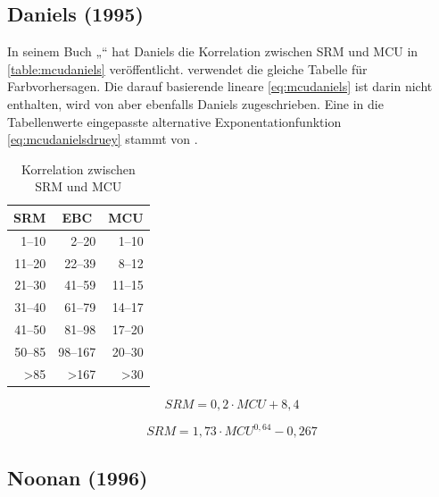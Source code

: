 \documentclass[a4paper,parskip=half]{scrartcl}
\newcommand{\MCUL}{\mathit{MCU}}
\newcommand{\SRM}{\mathit{SRM}}
\begin{document}
\subsection*{Daniels (1995)}

In seinem Buch „“ hat Daniels die Korrelation zwischen SRM und MCU in \autoref{table:mcudaniels} veröffentlicht. \textcite[10]{Holle2010} verwendet die gleiche Tabelle für Farbvorhersagen. Die darauf basierende lineare \autoref{eq:mcudaniels} ist darin nicht enthalten, wird von \textcite{Morey2004} aber ebenfalls Daniels zugeschrieben. Eine in die Tabellenwerte eingepasste alternative Exponentationfunktion \autoref{eq:mcudanielsdruey} stammt von \textcite{Druey1998}.

\begin{table}[H]
\centering
\begin{tabular}{rrr}
\toprule
\multicolumn{1}{c}{\textbf{SRM}} & \multicolumn{1}{c}{\textbf{EBC}} & \multicolumn{1}{c}{\textbf{MCU}} \\
\midrule
1–10 & 2–20 & 1–10 \\
11–20 & 22–39 & 8–12 \\
21–30 & 41–59 & 11–15 \\
31–40 & 61–79 & 14–17 \\
41–50 & 81–98 & 17–20 \\
50–85 & 98–167 & 20–30 \\
>85 & >167 & >30 \\
\bottomrule
\end{tabular}
\caption{Korrelation zwischen SRM und MCU \parencite[61]{Daniels1996}}
\label{table:mcudaniels}
\end{table}

\begin{equation}
\SRM = 0,2 \cdot \MCUL + 8,4
\label{eq:mcudaniels}
\end{equation}

\begin{equation}
\SRM = 1,73 \cdot \MCUL^{0,64} - 0,267
\label{eq:mcudanielsdruey}
\end{equation}

\subsection*{Noonan (1996)}
\end{document}

